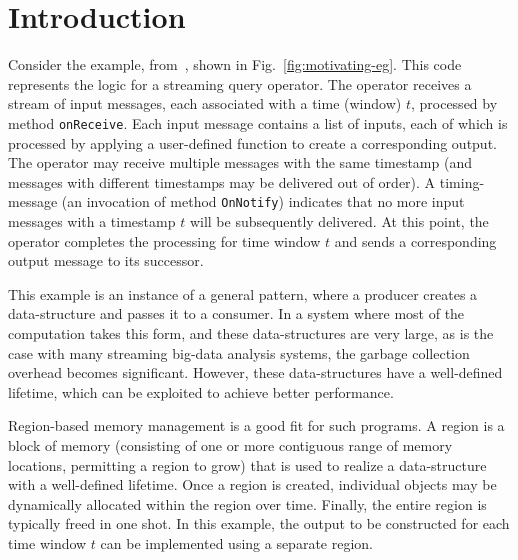 \newcommand{\TODO}[1]{\textbf{TODO: #1}}
\newcommand{\eg}{\emph{e.g.}}
\newcommand{\ie}{\emph{i.e.}}

\section{Introduction}
\label{sec:introduction}

Consider the example, from~\cite{Broom:HotOS}, shown in Fig.~\ref{fig:motivating-eg}.
This code represents the logic for a streaming query operator.
The operator receives a stream of input messages, each associated
with a time (window) $t$, processed by method \texttt{onReceive}.
Each input message contains a list of inputs, each of which is processed
by applying a user-defined function to create a corresponding output.
The operator may receive multiple messages with the same timestamp
(and messages with different timestamps may be delivered out of order).
A timing-message (an invocation of method \texttt{OnNotify}) indicates that
no more input messages with a timestamp $t$ will be subsequently delivered.
At this point, the operator completes the processing for time window $t$ and sends
a corresponding output message to its successor.



This example is an instance of a general pattern, where a producer
creates a data-structure and passes it to a consumer.  In a system
where most of the computation takes this form, and these
data-structures are very large, as is the case with many streaming
big-data analysis systems, the garbage collection overhead becomes
significant.
However, these data-structures have a well-defined lifetime, which can
be exploited to achieve better performance.

Region-based memory management is a good fit for such programs.
A region is a block of memory (consisting of one or more contiguous
range of memory locations, permitting a region to grow) that is used to realize
a data-structure with a well-defined lifetime. 
Once a region is created, individual objects may be dynamically allocated within
the region over time. Finally, the entire region is typically freed in one shot.
In this example, the output to be constructed for each time window $t$ can be
implemented using a separate region.

